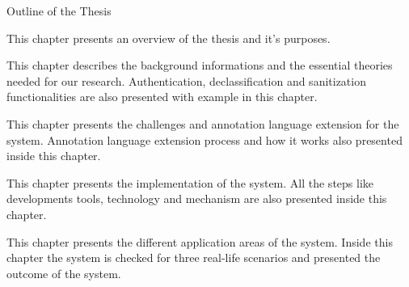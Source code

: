 \clearemptydoublepage

{}

\begin{center}
	\huge{Outline of the Thesis}
\end{center}



  \vspace{1mm}

\noindent  This chapter presents an overview of the thesis and it's purposes. 

  \vspace{1mm}

\noindent  This chapter describes the background informations and the essential theories needed for our research. Authentication, declassification and sanitization functionalities are also presented with example in this chapter.


  \vspace{1mm}

\noindent  This chapter presents the challenges and annotation language extension for the system. Annotation language extension process and how it works also presented inside this chapter.

  \vspace{1mm}

\noindent  This chapter presents the implementation of the system. All the steps like developments tools, technology and mechanism are also presented inside this chapter.

  \vspace{1mm}

\noindent  This chapter presents the different application areas of the system. Inside this chapter the system is checked for three real-life scenarios and presented the outcome of the system. 

